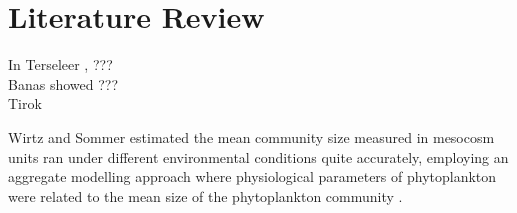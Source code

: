\section{Literature Review}


In Terseleer \citet{Terseleer_2014}, ???\\

Banas \citet{Banas_2011} showed ??? \\

Tirok \citet{Tirok_2011} 

Wirtz and Sommer \citet{Wirtz_Sommer_2013} estimated the mean community size measured in mesocosm units ran under different environmental conditions quite accurately, employing an aggregate modelling approach where physiological parameters of phytoplankton were related to the mean size of the phytoplankton community \cite{Wirtz_2013}.